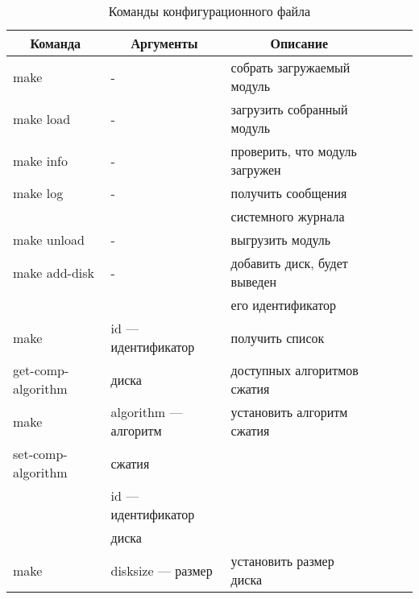 \begin{table}[h]
    \caption{Команды конфигурационного файла}
    \begin{center}
        \begin{tabular}{|l|l|l|l|l|l|}
                \hline
            \multicolumn{1}{|c}{\textbf{Команда}} & 
            \multicolumn{1}{|c|}{\textbf{Аргументы}} &
            \multicolumn{1}{c|}{\textbf{Описание}} \\ \hline
            make & - & собрать загружаемый модуль \\ \hline
            make load & - & загрузить собранный модуль \\ \hline
            make info & - & проверить, что модуль загружен \\ \hline
            \multicolumn{1}{|l}{make log} & \multicolumn{1}{|l}{-} & \multicolumn{1}{|l|}{получить сообщения} \\
            \multicolumn{1}{|l}{} & \multicolumn{1}{|l}{} & \multicolumn{1}{|l|}{системного журнала} \\ \hline
            make unload & - & выгрузить модуль \\ \hline
            \multicolumn{1}{|l}{make add-disk} & \multicolumn{1}{|l}{-} & \multicolumn{1}{|l|}{добавить диск, будет выведен} \\
            \multicolumn{1}{|l}{} & \multicolumn{1}{|l}{} & \multicolumn{1}{|l|}{его идентификатор} \\ \hline
            \multicolumn{1}{|l}{make} & \multicolumn{1}{|l}{id --- идентификатор} & \multicolumn{1}{|l|}{получить список} \\
            \multicolumn{1}{|l}{get-comp-algorithm} & \multicolumn{1}{|l}{диска} & \multicolumn{1}{|l|}{доступных алгоритмов сжатия} \\ \hline
            \multicolumn{1}{|l}{make} & \multicolumn{1}{|l}{algorithm --- алгоритм} & \multicolumn{1}{|l|}{установить алгоритм сжатия} \\
            \multicolumn{1}{|l}{set-comp-algorithm} & \multicolumn{1}{|l}{сжатия} & \multicolumn{1}{|l|}{} \\
            \multicolumn{1}{|l}{} & \multicolumn{1}{|l}{id --- идентификатор} & \multicolumn{1}{|l|}{} \\
            \multicolumn{1}{|l}{} & \multicolumn{1}{|l}{диска} & \multicolumn{1}{|l|}{} \\ \hline
            \multicolumn{1}{|l}{make} & \multicolumn{1}{|l}{disksize --- размер} & \multicolumn{1}{|l|}{установить размер диска} \\

\end{tabular}
\end{center}
\end{table}
